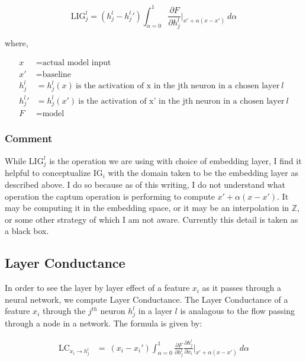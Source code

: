 \documentclass{article}
\begin{document}
\begin{equation}
\text{LIG}_{j}^{l} = (h_{j}^{l} - {h_{j}^{l}}') \int_{\alpha=0}^{1} \frac{\partial F}{\partial h_{j}^{l}}  \Big|_{x' + \alpha (x - x')} \ d\alpha
\end{equation}


\noindent where,

\begin{align*}
x &= \text{actual model input} \\
x' &= \text{baseline} \\
h_{j}^{l} &= h_{j}^{l}(x) \ \text{is the activation of x in the jth neuron in a chosen layer} \ l \\
{h_{j}^{l}}' &= {h_{j}^{l}}(x') \ \text{is the activation of x' in the jth neuron in a chosen layer} \ l \\
F &= \text{model}
\end{align*}

\subsubsection*{Comment}

While $\text{LIG}_{j}^{l}$ is the operation we are using with choice of embedding layer, I find it helpful to conceptualize $\text{IG}_i$ with the domain taken to be the embedding layer as described above.  I do so because as of this writing, I do not understand what operation the captum operation is performing to compute $x' + \alpha (x - x')$.  It may be computing it in the embedding space, or it may be an interpolation in $\mathbb{Z}$, or some other strategy of which I am not aware.  Currently this detail is taken as a black box.

\subsection{Layer Conductance}

In order to see the layer by layer effect of a feature $x_i$ as it passes through a neural network, we compute Layer Conductance.  The Layer Conductance of a feature $x_i$ through the $j^{th}$ neuron ${h_{j}^{l}}$ in a layer $l$ is analagous to the flow passing through a node in a network.  The formula is given by:

\begin{align*}
\text{LC}_{x_i \rightarrow {h_{j}^{l}}} &= \ (x_i - x_i') \int_{\alpha=0}^{1} \frac{\partial F}{\partial {h_{j}^{l}}} \frac{\partial {h_{j}^{l}}}{\partial x_i} \Big|_{x' + \alpha (x - x')} \ d\alpha
\end{align*}
\end{document}
